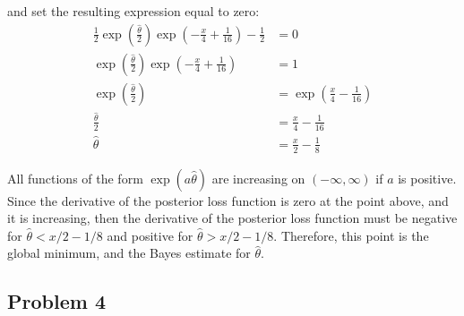 \documentclass{article}
\begin{document}
and set the resulting expression equal to zero: 
\begin{align*}
\frac{1}{2}\exp\left(\frac{\hat{\theta}}{2}\right)\exp\left(-\frac{x}{4}+\frac{1}{16}\right) - \frac{1}{2} &= 0 \\
\exp\left(\frac{\hat{\theta}}{2}\right)\exp\left(-\frac{x}{4}+\frac{1}{16}\right) &= 1 \\ 
\exp\left(\frac{\hat{\theta}}{2}\right) &= \exp\left(\frac{x}{4}-\frac{1}{16}\right) \\
\frac{\hat{\theta}}{2} &= \frac{x}{4}-\frac{1}{16} \\
\hat{\theta} &= \frac{x}{2}-\frac{1}{8}
\end{align*}
\pagebreak

All functions of the form $\exp(a\hat{\theta})$ are increasing on $(-\infty, \infty)$ if $a$ is positive. Since the derivative of the posterior loss function is zero at the point above, and it is increasing, then the derivative of the posterior loss function must be negative for $\hat{\theta} < x/2-1/8$ and positive for $\hat{\theta} > x/2-1/8$. Therefore, this point is the global minimum, and the Bayes estimate for $\hat{\theta}$. 

\subsection*{Problem 4}
\end{document}
